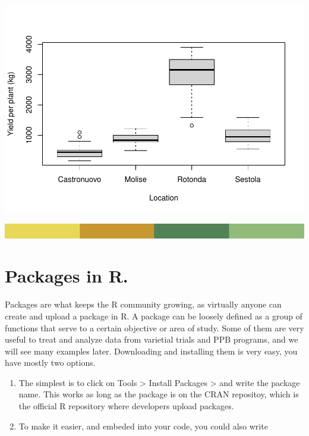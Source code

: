 \documentclass[
]{book}
\newenvironment{Shaded}{\begin{snugshade}}{\end{snugshade}}
\newcommand{\AttributeTok}[1]{\textcolor[rgb]{0.77,0.63,0.00}{#1}}
\newcommand{\FunctionTok}[1]{\textcolor[rgb]{0.00,0.00,0.00}{#1}}
\newcommand{\NormalTok}[1]{#1}
\newcommand{\SpecialCharTok}[1]{\textcolor[rgb]{0.00,0.00,0.00}{#1}}
\newcommand{\StringTok}[1]{\textcolor[rgb]{0.31,0.60,0.02}{#1}}
\begin{document}
\begin{Shaded}
\end{Shaded}

\includegraphics{PPB-Toolkit-for-R-and-R-Studio_files/figure-latex/unnamed-chunk-36-1.pdf}

\includegraphics{rsrstrip.png}

\hypertarget{packages-in-r.}{%
\section{Packages in R.}\label{packages-in-r.}}

Packages are what keeps the R community growing, as virtually anyone can create and upload a package in R. A package can be loosely defined as a group of functions that serve to a certain objective or area of study. Some of them are very useful to treat and analyze data from varietial trials and PPB programs, and we will see many examples later. Downloading and installing them is very easy, you have mostly two options.

\begin{enumerate}
\def\labelenumi{\arabic{enumi}.}
\item
  The simplest is to click on Tools \textgreater{} Install Packages \textgreater{} and write the package name. This works as long as the package is on the CRAN repositoy, which is the official R repository where developers upload packages.
\item
  To make it easier, and embeded into your code, you could also write
\end{enumerate}
\end{document}

